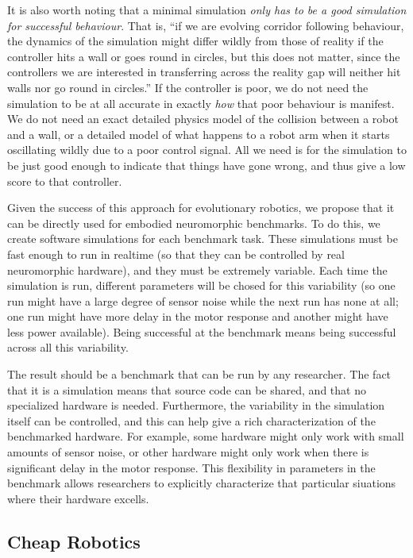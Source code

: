 \documentclass{frontiersSCNS} %
\begin{document}
It is also worth noting that a minimal simulation \emph{only has to be a
good simulation for successful behaviour}.  That is, ``if we are evolving 
corridor following behaviour, the dynamics of the simulation might
differ wildly from those of reality if the controller hits a wall or
goes round in circles, but this does
not matter, since the controllers we are interested in transferring
across the reality gap will neither
hit walls nor go round in circles.''  If the controller is poor, we do not 
need the simulation to be at all accurate in exactly \emph{how} that poor
behaviour is manifest.  We do not need an exact detailed physics model of
the collision between a robot and a wall, or a detailed model of what happens
to a robot arm when it starts oscillating wildly due to a poor control signal.
All we need is for the simulation to be just good enough to indicate that
things have gone wrong, and thus give a low score to that controller.

Given the success of this approach for evolutionary robotics, we propose
that it can be directly used for embodied neuromorphic benchmarks.  To do
this, we create software simulations for each benchmark task.  These simulations
must be fast enough to run in realtime (so that they can be controlled by
real neuromorphic hardware), and they must be extremely variable.  Each time
the simulation is run, different parameters will be chosed for this variability
(so one run might have a large degree of sensor noise while the next run has
none at all; one run might have more delay in the motor response and another
might have less power available).  Being successful at the benchmark means
being successful across all this variability.  

The result should be a benchmark that can be run by any researcher.  The fact
that it is a simulation means that source code can be shared, and that no
specialized hardware is needed.  Furthermore, the variability in the simulation
itself can be controlled, and this can help give a rich characterization of
the benchmarked hardware.  For example, some hardware might only work with
small amounts of sensor noise, or other hardware might only work when there
is significant delay in the motor response.  This flexibility in parameters
in the benchmark allows researchers to explicitly characterize that particular
siuations where their hardware excells.  

\subsection{Cheap Robotics}
\end{document}
